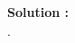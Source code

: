 \documentclass[journal,12pt,twocolumn]{IEEEtran}
\newenvironment{Proof}[2] {\textbf{Solution : }}{\hfill$\cdot$}
\begin{document}
\begin{Proof}{}{}
\begin{enumerate}
\end{enumerate}
  
 
 
\end{Proof} 
\end{document}
